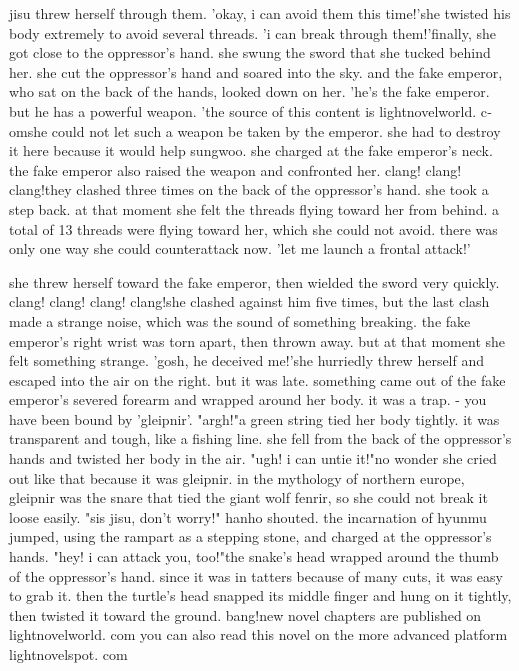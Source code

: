  jisu threw herself through them.
'okay, i can avoid them this time!'she twisted his body extremely to avoid several threads.
'i can break through them!'finally, she got close to the oppressor's hand.
 she swung the sword that she tucked behind her.
she cut the oppressor's hand and soared into the sky.
 and the fake emperor, who sat on the back of the hands, looked down on her.
'he's the fake emperor.
 but he has a powerful weapon.
'the source of this content is lightnovelworld.
c­omshe could not let such a weapon be taken by the emperor.
 she had to destroy it here because it would help sungwoo.
she charged at the fake emperor's neck.
 the fake emperor also raised the weapon and confronted her.
clang! clang! clang!they clashed three times on the back of the oppressor's hand.
 she took a step back.
at that moment she felt the threads flying toward her from behind.
 a total of 13 threads were flying toward her, which she could not avoid.
 there was only one way she could counterattack now.
'let me launch a frontal attack!'

she threw herself toward the fake emperor, then wielded the sword very quickly.
clang! clang! clang! clang!she clashed against him five times, but the last clash made a strange noise, which was the sound of something breaking.
 the fake emperor's right wrist was torn apart, then thrown away.
but at that moment she felt something strange.
'gosh, he deceived me!'she hurriedly threw herself and escaped into the air on the right.
 but it was late.
something came out of the fake emperor's severed forearm and wrapped around her body.
 it was a trap.
- you have been bound by 'gleipnir'.
"argh!"a green string tied her body tightly.
 it was transparent and tough, like a fishing line.
she fell from the back of the oppressor's hands and twisted her body in the air.
"ugh! i can untie it!"no wonder she cried out like that because it was gleipnir.
 in the mythology of northern europe, gleipnir was the snare that tied the giant wolf fenrir, so she could not break it loose easily.
"sis jisu, don't worry!" hanho shouted.
the incarnation of hyunmu jumped, using the rampart as a stepping stone, and charged at the oppressor's hands.
"hey! i can attack you, too!"the snake's head wrapped around the thumb of the oppressor's hand.
 since it was in tatters because of many cuts, it was easy to grab it.
 then the turtle's head snapped its middle finger and hung on it tightly, then twisted it toward the ground.
bang!new novel chapters are published on lightnovelworld.
com you can also read this novel on the more advanced platform lightnovelspot.
com

 